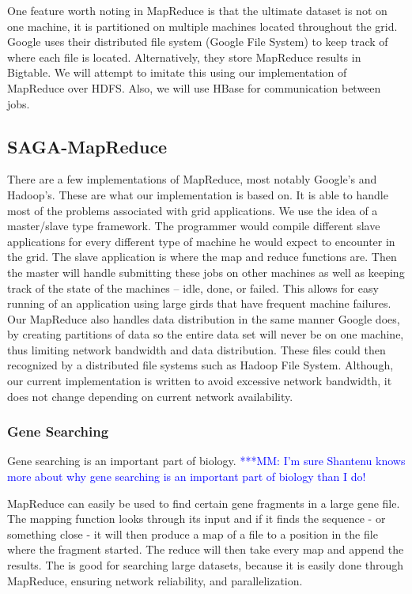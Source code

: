 \documentclass[conference,final]{IEEEtran}
\newcommand{\michaelnote}[1]{ {\textcolor{blue} { ***MM: #1 }}}
\newcommand{\michaelnote}[1]{ {\textcolor{blue} { ***MM: #1 }}}
\begin{document}
One feature worth noting in MapReduce is that the ultimate dataset is
not on one machine, it is partitioned on multiple machines located
throughout the grid. Google uses their distributed file system (Google
File System) to keep track of where each file is located.
Alternatively, they store MapReduce results in Bigtable.  We will
attempt to imitate this using our implementation of MapReduce over
HDFS.  Also, we will use HBase for communication between jobs.

\subsection{SAGA-MapReduce}

There are a few implementations of MapReduce, most notably Google's and
Hadoop's.  These are what our implementation is based on.  It is able
to handle most of the problems associated with grid applications.  We use
the idea of a master/slave type framework.  The programmer would compile
different slave applications for every different type of machine he 
would expect to encounter in the grid.  The slave application is
where the map and reduce functions are.  Then the master will handle
submitting these jobs on other machines as well as keeping track of
the state of the machines -- idle, done, or failed.  This allows for
easy running of an application using large girds that have frequent
machine failures.  Our MapReduce also handles data distribution in the
same manner Google does, by creating partitions of data so the entire
data set will never be on one machine, thus limiting network bandwidth
and data distribution.  These files could then recognized by a
distributed file systems such as Hadoop File System.  Although, our
current implementation is written to avoid excessive network
bandwidth, it does not change depending on current network
availability.

\subsubsection{Gene Searching}

Gene searching is an important part of biology.  \michaelnote{I'm sure
  Shantenu knows more about why gene searching is an important part of
  biology than I do!}

MapReduce can easily be used to find certain gene fragments in a large
gene file.  The mapping function looks through its input and if it
finds the sequence - or something close - it will then produce a map
of a file to a position in the file where the fragment started.  The
reduce will then take every map and append the results.  The is good
for searching large datasets, because it is easily done through
MapReduce, ensuring network reliability, and parallelization.
\end{document}

